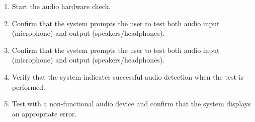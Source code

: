 \documentclass[12pt, titlepage]{article}
\begin{document}
\begin{itemize}
\begin{mdframed}[linewidth=0.5mm]
\begin{mdframed}[linewidth=0.5mm]
\begin{enumerate}[noitemsep]
        \item Start the audio hardware check.
        \item Confirm that the system prompts the user to test both audio input \\ (microphone) and output (speakers/headphones).
        \item Confirm that the system prompts the user to test both audio input \\ (microphone) and output (speakers/headphones).
        \item Verify that the system indicates successful audio detection when the test is performed.
        \item Test with a non-functional audio device and confirm that the system displays an appropriate error.
      \end{enumerate}
  \end{mdframed}
  \end{mdframed}


\end{itemize}
\end{document}
